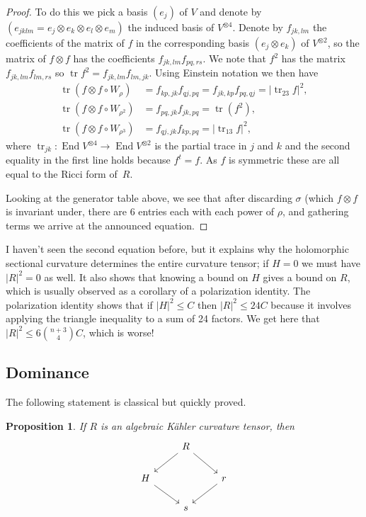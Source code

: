 \documentclass[10pt,a4paper]{amsart}
\newtheorem{prop}[theo]{Proposition}
\theoremstyle{definition}
\DeclareMathOperator{\tr}{tr}
\DeclareMathOperator{\End}{End}
\begin{document}
\begin{proof}
To do this we pick a basis $(e_j)$ of $V$ and denote by $(e_{jklm} = e_j
\otimes e_k \otimes e_l \otimes e_m)$ the induced basis of $V^{\otimes 4}$.
Denote by $f_{jk,lm}$ the coefficients of the matrix of $f$ in the
corresponding basis $(e_j \otimes e_k)$ of $V^{\otimes 2}$, so the matrix of
$f \otimes f$ has the coefficients $f_{jk,lm} f_{pq,rs}$.
We note that $f^2$ has the matrix $f_{jk,lm} f_{lm, rs}$ so $\tr f^2 = f_{jk,lm} f_{lm,jk}$.
Using Einstein notation we then have
\begin{align*}
\tr(f \otimes f \circ W_{\rho})
&= f_{kp,jk} f_{qj,pq}
= f_{jk,kp} f_{pq,qj}
= |\! \tr_{23} f|^2,
\\
\tr(f \otimes f \circ W_{\rho^2})
&= f_{pq,jk} f_{jk,pq} = \tr(f^2),
\\
\tr(f \otimes f \circ W_{\rho^3})
&= f_{qj,jk} f_{kp,pq}
= |\! \tr_{13} f|^2,
\end{align*}
where $\tr_{jk} : \End V^{\otimes 4} \to \End V^{\otimes 2}$ is the partial
trace in $j$ and $k$ and the second equality in the first line holds because
$f^t = f$.
As $f$ is symmetric these are all equal to the Ricci form of~$R$.%

Looking at the generator table above, we see that after discarding $\sigma$
(which $f \otimes f$ is invariant under, there are 6 entries each with each
power of $\rho$, and gathering terms we arrive at the announced equation.
\end{proof}


I haven't seen the second equation before, but it explains why the holomorphic
sectional curvature determines the entire curvature tensor; if $H = 0$ we must
have $|R|^2 = 0$ as well.
It also shows that knowing a bound on $H$ gives a bound on $R$, which is
usually observed as a corollary of a polarization identity.
The polarization identity shows that if $|H|^2 \leq C$ then $|R|^2 \leq
24 C$ because it involves applying the triangle inequality to a sum of 24 factors.
We get here that $|R|^2 \leq 6\binom{n+3}{4} C$, which is worse!


\subsection*{Dominance}

The following statement is classical but quickly proved.

\begin{prop}
If $R$ is an algebraic K\"ahler curvature tensor, then
$$
\begin{tikzcd}
& R \ar[dl] \ar[dr] &
\\
H \ar[dr] & & r \ar[dl]
\\
& s &
\end{tikzcd}
$$
\end{prop}
\end{document}
